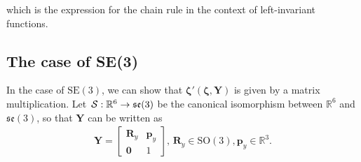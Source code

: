 which is the expression for the chain rule in the context of left-invariant functions. 
\subsection{The case of SE(3)}\label{app:prop-Lop-chain-rule-SE3}
In the case of $\text{SE}(3)$, we can show that $\boldsymbol{\zeta}'(\boldsymbol{\zeta}, \mathbf{Y})$ is given by a  matrix multiplication. Let $\SL:\mathbb{R}^6\to\mathfrak{se}(3)$ be the canonical isomorphism between $\mathbb{R}^6$ and $\mathfrak{se}(3)$, so that $\mathbf{Y}$ can be written as
\begin{align}
    \mathbf{Y} = \begin{bmatrix}
        \mathbf{R}_y & \mathbf{p}_y\\
        \mathbf{0} & 1
    \end{bmatrix},\,\mathbf{R}_y\in\text{SO}(3), \mathbf{p}_y\in\mathbb{R}^3.
\end{align}

